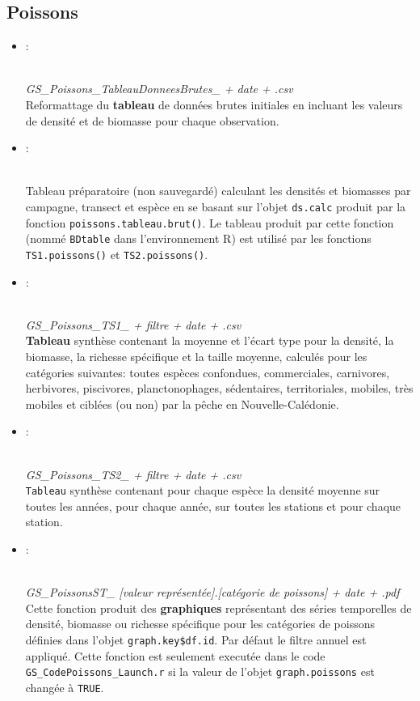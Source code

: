 \documentclass{article}
\begin{document}
\subsection{Poissons}
\begin{itemize}
\item[] \hypertarget{p1}{:}\\
\emph{GS\_Poissons\_TableauDonneesBrutes\_ + date + .csv}\\
Reformattage du \textbf{tableau} de données brutes initiales en incluant les
valeurs de densité et de biomasse pour chaque observation.


\item[] \hypertarget{p2}{:} \\
Tableau préparatoire (non sauvegardé) calculant les densités et
biomasses par campagne, transect et espèce en se basant sur l'objet
\texttt{ds.calc} produit par la fonction
\texttt{poissons.tableau.brut()}. Le tableau produit par cette
fonction (nommé \texttt{BDtable} dans l'environnement R) est utilisé
par les fonctions \texttt{TS1.poissons()} et \texttt{TS2.poissons()}.

\item[]\hypertarget{p3}{:}\\
\emph{GS\_Poissons\_TS1\_ + filtre + date + .csv}\\
 \textbf{Tableau} synthèse contenant la moyenne et l'écart type pour la
 densité, la biomasse, la richesse spécifique et la taille moyenne,
 calculés pour les catégories suivantes: toutes espèces confondues,
 commerciales, carnivores, herbivores, piscivores, planctonophages,
 sédentaires, territoriales, mobiles, très mobiles et ciblées (ou non)
 par la pêche en Nouvelle-Calédonie.

\item[]\hypertarget{p4}{:}\\
  \emph{GS\_Poissons\_TS2\_ + filtre + date + .csv}\ \\
\texttt{Tableau} synthèse contenant pour chaque espèce la densité
moyenne sur toutes les années, pour chaque année, sur toutes les
stations et pour chaque station.

\item[]\hypertarget{p5}{:}\\
 \emph{GS\_PoissonsST\_ [valeur représentée].[catégorie de poissons] +
   date + .pdf}\\
 Cette fonction produit des \textbf{graphiques} représentant des séries
 temporelles de densité, biomasse ou richesse spécifique pour les
 catégories de poissons définies dans l'objet
 \texttt{graph.key\$df.id}. Par défaut le filtre annuel est
 appliqué. Cette fonction est seulement executée dans le code
 \texttt{GS\_CodePoissons\_Launch.r} si la valeur de l'objet
 \texttt{graph.poissons} est changée à \texttt{TRUE}.

  \end{itemize}
\end{document}
